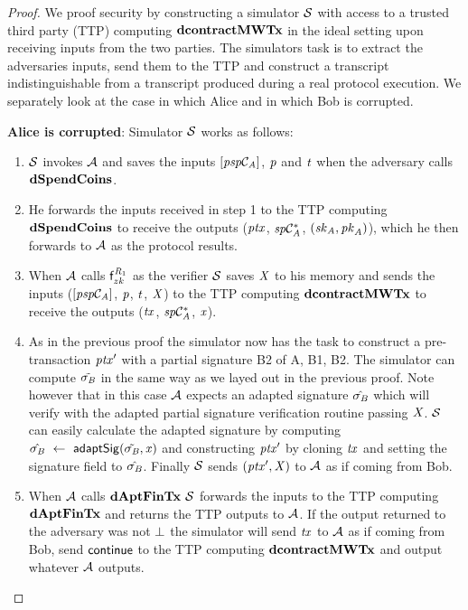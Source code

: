 \begin{proof}
    We proof security by constructing a simulator $\mathcal{S}$ with access to a trusted third party (TTP) computing $\mathbf{dcontractMWTx}$ in the ideal setting upon receiving inputs from the two parties.
    The simulators task is to extract the adversaries inputs, send them to the TTP and construct a transcript indistinguishable from a transcript produced during a real protocol execution.
    We separately look at the case in which Alice and in which Bob is corrupted.

    \textbf{Alice is corrupted}: Simulator $\mathcal{S}$ works as follows:
    \begin{enumerate}
        \item $\mathcal{S}$ invokes $\mathcal{A}$ and saves the inputs $[\mathit{psp}\mathcal{C}_{\mathit{A}}]$, $\mathit{p}$ and $\mathit{t}$ when the adversary calls $\mathbf{dSpendCoins}$.
        \item He forwards the inputs received in step 1 to the TTP computing $\mathbf{dSpendCoins}$ to receive the outputs ($\mathit{ptx}$, $\mathit{sp}\mathcal{C}_{\mathit{A}}^*$, $(\mathit{sk}_{\mathit{A}}, \mathit{pk}_{\mathit{A}})$), which he then forwards to $\mathcal{A}$ as the protocol results.
        \item When $\mathcal{A}$ calls $\mathsf{f}^{\mathit{R}_1}_{zk}$ as the verifier $\mathcal{S}$ saves $\mathit{X}$ to his memory and sends the inputs ($[\mathit{psp}\mathcal{C}_{\mathit{A}}]$, $\mathit{p}$, $\mathit{t}$, $\mathit{X}$) to the TTP computing $\mathbf{dcontractMWTx}$ to receive the outputs ($\mathit{tx}$, $\mathit{sp}\mathcal{C}_{\mathit{A}}^*$, $\mathit{x}$).
        \item As in the previous proof the simulator now has the task to construct a pre-transaction ${\mathit{ptx}}'$ with a partial signature B2 of A, B1, B2.
        The simulator can compute $\tilde{\sigma_{\mathit{B}}}$ in the same way as we layed out in the previous proof.
        Note however that in this case $\mathcal{A}$ expects an adapted signature $\hat{\sigma_{\mathit{B}}}$ which will verify with the adapted partial signature verification routine passing $\mathit{X}$.
        $\mathcal{S}$ can easily calculate the adapted signature by computing $\hat{\sigma_{\mathit{B}}} ~\leftarrow~ \mathsf{adaptSig}(\tilde{\sigma_{\mathit{B}}}, \mathit{x})$ and constructing ${\mathit{ptx}}'$ by cloning $\mathit{tx}$ and setting the signature field to $\hat{\sigma_{\mathit{B}}}$.
        Finally $\mathcal{S}$ sends $({\mathit{ptx}}',\mathit{X})$ to $\mathcal{A}$ as if coming from Bob.
        \item When $\mathcal{A}$ calls $\mathbf{dAptFinTx}$ $\mathcal{S}$ forwards the inputs to the TTP computing $\mathbf{dAptFinTx}$ and returns the TTP outputs to $\mathcal{A}$.
        If the output returned to the adversary was not $\bot$ the simulator will send $\mathit{tx}$ to $\mathcal{A}$ as if coming from Bob, send $\mathsf{continue}$ to the TTP computing $\mathbf{dcontractMWTx}$ and output whatever $\mathcal{A}$ outputs.
    \end{enumerate}


\end{proof}
